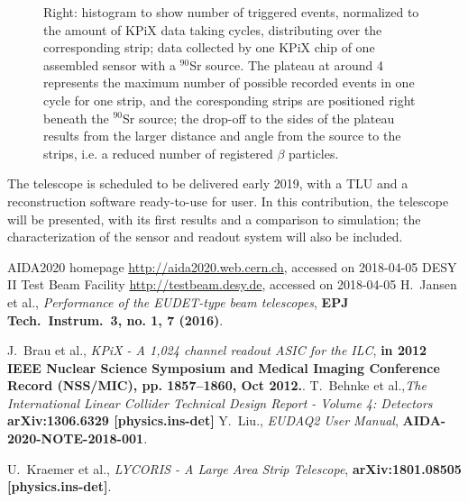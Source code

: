 \begin{figure}[!ht]
{Right: histogram to show number of triggered events, normalized to the amount of KPiX data taking cycles, distributing over the corresponding strip;
data collected by one KPiX chip of one assembled sensor with a $^{90}$Sr source.
The plateau at around 4 represents the maximum number of possible recorded events in one cycle for one strip, and the coresponding strips are positioned right beneath the $^{90}$Sr source;
the drop-off to the sides of the plateau results from the larger distance and angle from the source to the strips, i.e. a reduced number of registered $\beta$ particles.
}%
\label{fig:2figs}%
\end{figure}

The \lycoris telescope is scheduled to be delivered early 2019, with a TLU and a reconstruction software ready-to-use for user.
In this contribution, the \lycoris telescope will be presented, with its first results and a comparison to simulation;
the characterization of the sensor and readout system will also be included.

\footnotesize
\begin{thebibliography}{1}
 AIDA2020 homepage \url{http://aida2020.web.cern.ch}, accessed on 2018-04-05
 DESY II Test Beam Facility \url{http://testbeam.desy.de}, accessed on 2018-04-05
 H.~Jansen et al., {\em Performance of the EUDET-type beam telescopes},
\textbf{EPJ Tech.\ Instrum.\  {\bf 3}, no. 1, 7 (2016)}.

 J.~Brau et al., {\em KPiX - A 1,024 channel readout ASIC for the ILC},
\textbf{in 2012 IEEE Nuclear Science Symposium and Medical Imaging Conference Record (NSS/MIC), pp. 1857–1860, Oct 2012.}.
  T.~Behnke et al.,{\em The International Linear Collider Technical Design Report - Volume 4: Detectors}
\textbf{  arXiv:1306.6329 [physics.ins-det]}
 Y.~Liu., {\em EUDAQ2 User Manual},
\textbf{AIDA-2020-NOTE-2018-001}.

 U.~Kraemer et al., {\em LYCORIS - A Large Area Strip Telescope},
\textbf{arXiv:1801.08505 [physics.ins-det]}.


\end{thebibliography}


